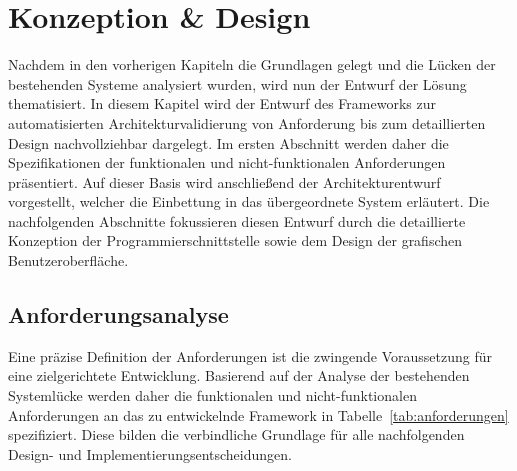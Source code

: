 
\chapter{Konzeption \& Design}
\label{ch:KuD}

Nachdem in den vorherigen Kapiteln die Grundlagen gelegt und die Lücken der bestehenden Systeme analysiert wurden, wird nun der Entwurf der Lösung thematisiert. In diesem Kapitel wird der Entwurf des Frameworks zur automatisierten Architekturvalidierung von Anforderung bis zum detaillierten Design nachvollziehbar dargelegt. Im ersten Abschnitt werden daher die Spezifikationen der funktionalen und nicht-funktionalen Anforderungen präsentiert. Auf dieser Basis wird anschließend der Architekturentwurf vorgestellt, welcher die Einbettung in das übergeordnete System erläutert. Die nachfolgenden Abschnitte fokussieren diesen Entwurf durch die detaillierte Konzeption der Programmierschnittstelle sowie dem Design der grafischen Benutzeroberfläche.


\section{Anforderungsanalyse}
\label{sec:Anforderungsanalyse}

Eine präzise Definition der Anforderungen ist die zwingende Voraussetzung für eine zielgerichtete Entwicklung. Basierend auf der Analyse der bestehenden Systemlücke werden daher die funktionalen und nicht-funktionalen Anforderungen an das zu entwickelnde Framework in Tabelle~\ref{tab:anforderungen} spezifiziert. Diese bilden die verbindliche Grundlage für alle nachfolgenden Design- und Implementierungsentscheidungen.

